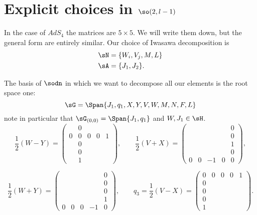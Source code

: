 
\section{Explicit choices in \texorpdfstring{$\so(2,l-1)$}{so2l-1}}

In the case of $AdS_4$ the matrices are $5\times 5$. We will write them down, but the general form are entirely similar. Our choice of Iwasawa decomposition is
\begin{subequations}
	\begin{align}
		\sN & =\{W_i,V_j,M,L\} \\
		\sA & =\{ J_1, J_2\}.
	\end{align}
\end{subequations}


The basis of $\sodn$ in which we want to decompose all our elements is the root space one:
\begin{equation}
	\sG=\Span\{J_1,q_1,X,Y,V,W,M,N,F,L\}
\end{equation}
note in particular that $\sG_{(0,0)}=\Span\{J_1,q_1\}$ and $W,J_1\in\sH$.
\begin{equation}
	\frac{1}{2}(W-Y)=
	\begin{pmatrix}
		  & 0             \\
		0 & 0 & 0 & 0 & 1 \\
		  & 0             \\
		  & 0             \\
		  & 1
	\end{pmatrix},
	\qquad
	\frac{1}{2}(V+X)=
	\begin{pmatrix}
		  &   &    &   & 0 \\
		  &   &    &   & 0 \\
		  &   &    &   & 1 \\
		  &   &    &   & 0 \\
		0 & 0 & -1 & 0 & 0
	\end{pmatrix},
\end{equation}



\begin{equation}
	\frac{1}{2}(W+Y)=
	\begin{pmatrix}
		  &   &   &    & 0 \\
		  &   &   &    & 0 \\
		  &   &   &    & 0 \\
		  &   &   &    & 1 \\
		0 & 0 & 0 & -1 & 0
	\end{pmatrix},
	\qquad
	q_3=\frac{1}{2}(V-X)=
	\begin{pmatrix}
		0 & 0 & 0 & 0 & 1 \\
		0                 \\
		0                 \\
		0                 \\
		1
	\end{pmatrix}.
\end{equation}


